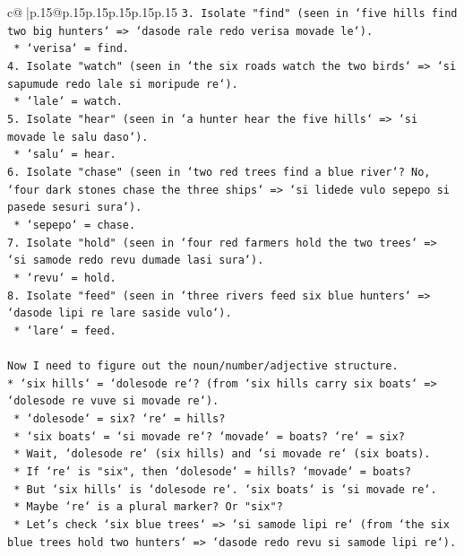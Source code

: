 \documentclass{article}
\begin{document}
{\begin{supertabular}{c@{$\;$}|p{.15\linewidth}@{}p{.15\linewidth}p{.15\linewidth}p{.15\linewidth}p{.15\linewidth}p{.15\linewidth}}
{{{\texttt{3.  Isolate "find" (seen in `five hills find two big hunters` => `dasode rale redo verisa movade le`).} \\
\texttt{    *   `verisa` = find.} \\
\texttt{4.  Isolate "watch" (seen in `the six roads watch the two birds` => `si sapumude redo lale si moripude re`).} \\
\texttt{    *   `lale` = watch.} \\
\texttt{5.  Isolate "hear" (seen in `a hunter hear the five hills` => `si movade le salu daso`).} \\
\texttt{    *   `salu` = hear.} \\
\texttt{6.  Isolate "chase" (seen in `two red trees find a blue river`? No, `four dark stones chase the three ships` => `si lidede vulo sepepo si pasede sesuri sura`).} \\
\texttt{    *   `sepepo` = chase.} \\
\texttt{7.  Isolate "hold" (seen in `four red farmers hold the two trees` => `si samode redo revu dumade lasi sura`).} \\
\texttt{    *   `revu` = hold.} \\
\texttt{8.  Isolate "feed" (seen in `three rivers feed six blue hunters` => `dasode lipi re lare saside vulo`).} \\
\texttt{    *   `lare` = feed.} \\
\\ 
\texttt{Now I need to figure out the noun/number/adjective structure.} \\
\texttt{*   `six hills` = `dolesode re`? (from `six hills carry six boats` => `dolesode re vuve si movade re`).} \\
\texttt{    *   `dolesode` = six? `re` = hills?} \\
\texttt{    *   `six boats` = `si movade re`? `movade` = boats? `re` = six?} \\
\texttt{    *   Wait, `dolesode re` (six hills) and `si movade re` (six boats).} \\
\texttt{    *   If `re` is "six", then `dolesode` = hills? `movade` = boats?} \\
\texttt{    *   But `six hills` is `dolesode re`. `six boats` is `si movade re`.} \\
\texttt{    *   Maybe `re` is a plural marker? Or "six"?} \\
\texttt{    *   Let's check `six blue trees` => `si samode lipi re` (from `the six blue trees hold two hunters` => `dasode redo revu si samode lipi re`).} \\
}}}
\end{supertabular}}
\end{document}

